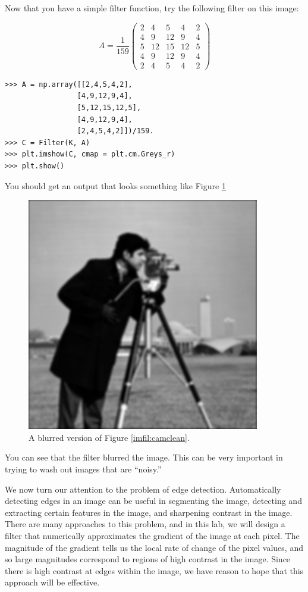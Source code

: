 Now that you have a simple filter function, try the following filter on this image:

\[
A = \frac{1}{159}\begin{pmatrix}
2&4&5&4&2\\
4&9&12&9&4\\
5&12&15&12&5\\
4&9&12&9&4\\
2&4&5&4&2
\end{pmatrix}
\]

\begin{lstlisting}
>>> A = np.array([[2,4,5,4,2],
                 [4,9,12,9,4],
                 [5,12,15,12,5],
                 [4,9,12,9,4],
                 [2,4,5,4,2]])/159.
>>> C = Filter(K, A)
>>> plt.imshow(C, cmap = plt.cm.Greys_r)
>>> plt.show()
\end{lstlisting}
You should get an output that looks something like Figure \ref{imfil:camblur}
\begin{figure}
\includegraphics{cameramanBlur.pdf}
\caption{A blurred version of Figure \ref{imfil:camclean}.}
\label{imfil:camblur}
\end{figure}
You can see that the filter blurred the image. This can be very important in trying to 
wash out images that are ``noisy.''

We now turn our attention to the problem of edge detection. Automatically detecting edges in an image
can be useful in segmenting the image, detecting and extracting certain features in the image, and
sharpening contrast in the image. There are many approaches to this problem, and in this lab, we will
design a filter that numerically approximates the gradient of the image at each pixel. The magnitude
of the gradient tells us the local rate of change of the pixel values, and so large magnitudes 
correspond to regions of high contrast in the image. Since there is high contrast at edges within
the image, we have reason to hope that this approach will be effective.

